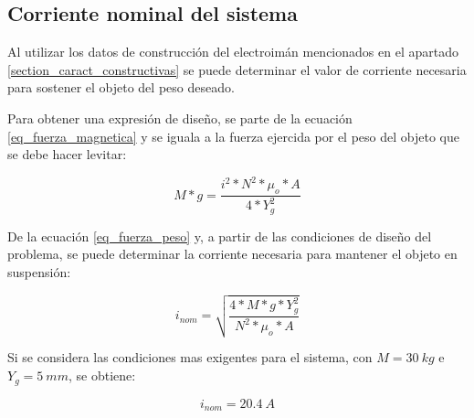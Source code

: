 
\subsection{Corriente nominal del sistema}

\noindent Al utilizar los datos de construcción del electroimán mencionados en el apartado \ref{section_caract_constructivas} se puede determinar el valor de corriente necesaria para sostener el objeto del peso deseado.



\noindent Para obtener una expresión de diseño, se parte de la ecuación \ref{eq_fuerza_magnetica} y se iguala a la fuerza ejercida por el peso del objeto que se debe hacer levitar:

\begin{equation}\label{eq_fuerza_peso}
	M*g=\frac{i^{2}*N^{2}*\mu_{o}*A}{4*Y_{g}^{2}}
\end{equation}

\noindent De la ecuación \ref{eq_fuerza_peso} y, a partir de las condiciones de diseño del problema, se puede determinar la corriente necesaria para mantener el objeto en suspensión:

\begin{equation} \label{eq_corriente_peso}
	i_{nom}=\sqrt{\frac{4*M*g*Y_{g}^{2}}{N^{2}*\mu_{o}*A}}
\end{equation}

Si se considera las condiciones mas exigentes para el sistema, con $M=30\:kg$ e $Y_{g}=5\:mm$, se obtiene:

\begin{equation}
	i_{nom}=20.4\:A
\end{equation}

